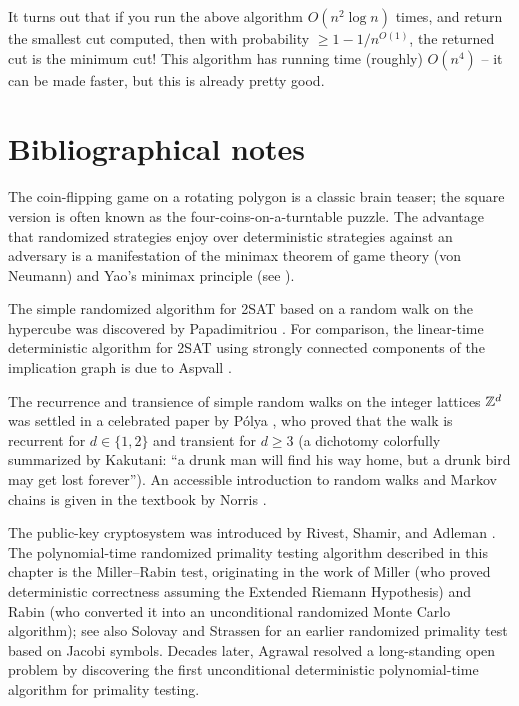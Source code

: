 It turns out that if you run the above algorithm
\begin{math}
    O(n^2 \log n)
\end{math}
times, and return the smallest cut computed, then with probability
$\geq 1-1/n^{O(1)}$, the returned cut is the minimum cut! This algorithm has
running time (roughly) $O(n^4)$ -- it can be made faster, but this is
already pretty good.



\section{Bibliographical notes}

The coin-flipping game on a rotating polygon is a classic brain teaser;
the square version is often known as the four-coins-on-a-turntable
puzzle. The advantage that randomized strategies enjoy over
deterministic strategies against an adversary is a manifestation of the
minimax theorem of game theory (von Neumann) and Yao's minimax principle
(see \cite{mr-ra-95}).

The simple randomized algorithm for 2SAT based on a random walk on the
hypercube was discovered by Papadimitriou \cite{p-ssta-91}. For
comparison, the linear-time deterministic algorithm for 2SAT using
strongly connected components of the implication graph is due to Aspvall
\etal \cite{apt-ltat-79}.

The recurrence and transience of simple random walks on the integer
lattices $\mathbb{Z}^d$ was settled in a celebrated paper by P{\'o}lya
\cite{p-uawbi-21}, who proved that the walk is recurrent for $d \in \{1,
2\}$ and transient for $d \geq 3$ (a dichotomy colorfully summarized by
Kakutani: ``a drunk man will find his way home, but a drunk bird may get lost
forever''). An accessible introduction to random walks and Markov chains is
given in the textbook by Norris \cite{n-mc-98}.

The \RSA public-key cryptosystem was introduced by Rivest, Shamir, and
Adleman \cite{rsa-modsp-78}. The polynomial-time randomized primality
testing algorithm described in this chapter is the Miller--Rabin test,
originating in the work of Miller \cite{m-rhtp-76} (who proved
deterministic correctness assuming the Extended Riemann Hypothesis) and
Rabin \cite{r-patp-80} (who converted it into an unconditional randomized
Monte Carlo algorithm); see also Solovay and Strassen \cite{ss-fmctp-77}
for an earlier randomized primality test based on Jacobi symbols. Decades
later, Agrawal \etal \cite{aks-pp-04} resolved a long-standing open
problem by discovering the first unconditional deterministic
polynomial-time algorithm for primality testing.


